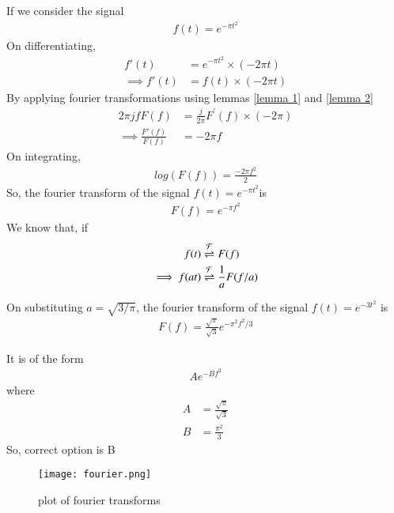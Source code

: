 \documentclass[journal,12pt,twocolumn]{IEEEtran}
\begin{document}
If we consider the signal
\begin{align}
    f(t) = e^{-\pi t^2}
\end{align}
On differentiating,
\begin{align}
     f'(t) &= e^{-\pi t^2}\times(-2\pi t)\\
    \implies f'(t) &= f(t)\times (-2\pi t)
\end{align}
By applying fourier transformations using lemmas \ref{lemma 1} and \ref{lemma 2}
\begin{align}
    2\pi jfF(f) &= \frac{j}{2\pi}F^{'}(f) \times (-2\pi)\\
    \implies \frac{F'(f)}{F(f)} &= -2\pi f
\end{align}
On integrating,
\begin{align}
    log(F(f)) = \frac{-2\pi f^2}{2}
\end{align}
So, the fourier transform of the signal $f(t) = e^{-\pi t^2}$is
\begin{align}
    F(f) = e^{-\pi f^2}
\end{align}
We know that, if 
\begin{align}
    f(t) &\overset{\mathcal{F}}{ \rightleftharpoons} F(f)\\
    \implies f(at) &\overset{\mathcal{F}}{ \rightleftharpoons} \frac{1}{a}F(f/a)
\end{align}

On substituting $a = \sqrt{3/\pi}$, the fourier transform of the signal $f(t) = e^{-3t^2}$ is 
\begin{align}
   F(f) =  \frac{\sqrt{\pi}}{\sqrt{3}}e^{-\pi^2 f^2/3}
\end{align}

It is of the form 
\begin{align}
    Ae^{-Bf^2} 
\end{align}
where
\begin{align}
    A &= \frac{\sqrt{\pi}}{\sqrt{3}}\\
    B &= \frac{\pi^2}{3}
\end{align}
So, correct option is B

\begin{figure}[htp]
    \centering
    \texttt{[image: fourier.png]}
    \caption{plot of fourier transforms}
    \label{fig:my_label}
\end{figure}
\end{document}
